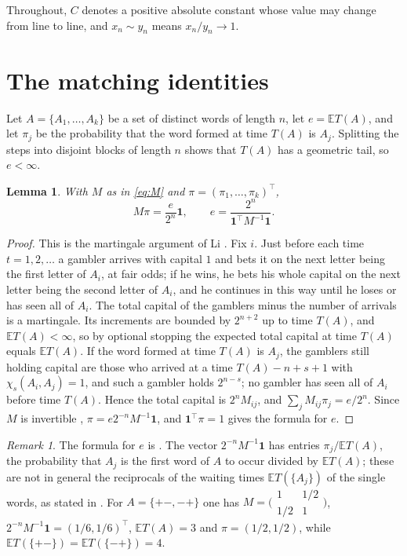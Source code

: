 \documentclass[11pt]{amsart}
\newtheorem{lemma}[theorem]{Lemma}
\theoremstyle{remark}
\newtheorem{remark}[theorem]{Remark}
\numberwithin{equation}{section}
\newcommand{\EE}{\mathbb{E}}
\newcommand{\one}{\mathbf 1}
\begin{document}
Throughout, $C$ denotes a positive absolute constant whose value may change from line to line, and $x_n\sim y_n$ means $x_n/y_n\to1$.

\section{The matching identities}\label{sec:identities}

Let $A=\{A_1,\dots,A_k\}$ be a set of distinct words of length $n$, let $e=\EE T(A)$, and let $\pi_j$ be the probability that the word formed at time $T(A)$ is $A_j$. Splitting the steps into disjoint blocks of length $n$ shows that $T(A)$ has a geometric tail, so $e<\infty$.

\begin{lemma}\label{lem:matching}
With $M$ as in \eqref{eq:M} and $\pi=(\pi_1,\dots,\pi_k)^\top$,
\begin{equation}\label{eq:Mpi}
M\pi=\frac e{2^n}\one,\qquad e=\frac{2^n}{\one^\top M^{-1}\one}.
\end{equation}
\end{lemma}

\begin{proof}
This is the martingale argument of Li \cite{Li}. Fix $i$. Just before each time $t=1,2,\dots$ a gambler arrives with capital $1$ and bets it on the next letter being the first letter of $A_i$, at fair odds; if he wins, he bets his whole capital on the next letter being the second letter of $A_i$, and he continues in this way until he loses or has seen all of $A_i$. The total capital of the gamblers minus the number of arrivals is a martingale. Its increments are bounded by $2^{n+2}$ up to time $T(A)$, and $\EE T(A)<\infty$, so by optional stopping the expected total capital at time $T(A)$ equals $\EE T(A)$. If the word formed at time $T(A)$ is $A_j$, the gamblers still holding capital are those who arrived at a time $T(A)-n+s+1$ with $\chi_s(A_i,A_j)=1$, and such a gambler holds $2^{n-s}$; no gambler has seen all of $A_i$ before time $T(A)$. Hence the total capital is $2^nM_{ij}$, and $\sum_jM_{ij}\pi_j=e/2^n$. Since $M$ is invertible \cite[Theorem~2.1]{PT}, $\pi=e2^{-n}M^{-1}\one$, and $\one^\top\pi=1$ gives the formula for $e$.
\end{proof}

\begin{remark}\label{rem:PT}
The formula for $e$ is \cite[(2.4)]{PT}. The vector $2^{-n}M^{-1}\one$ has entries $\pi_j/\EE T(A)$, the probability that $A_j$ is the first word of $A$ to occur divided by $\EE T(A)$; these are not in general the reciprocals of the waiting times $\EE T(\{A_j\})$ of the single words, as stated in \cite[(2.3)]{PT}. For $A=\{+-,-+\}$ one has $M=\bigl(\begin{smallmatrix}1&1/2\\1/2&1\end{smallmatrix}\bigr)$, $2^{-n}M^{-1}\one=(1/6,1/6)^\top$, $\EE T(A)=3$ and $\pi=(1/2,1/2)$, while $\EE T(\{+-\})=\EE T(\{-+\})=4$.
\end{remark}
\end{document}
